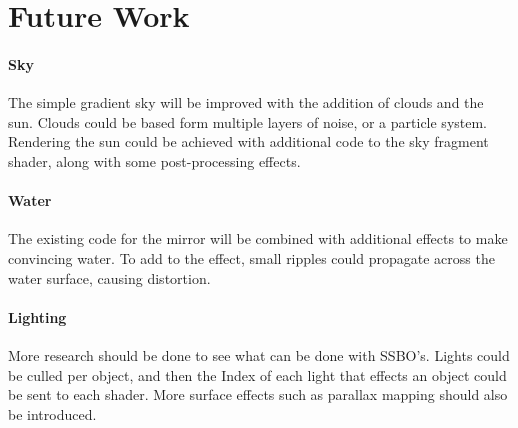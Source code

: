 \documentclass[conference]{acmsiggraph}
\begin{document}
\section{Future Work}

\paragraph{Sky}
The simple gradient sky will be improved with the addition of clouds and the sun. Clouds could be based form multiple layers of noise, or a particle system. Rendering the sun could be achieved with additional code to the sky fragment shader, along with some post-processing effects.

\paragraph{Water}
The existing code for the mirror will be combined with additional effects to make convincing water. To add to the effect, small ripples could propagate across the water surface, causing distortion.

\paragraph{Lighting}
More research should be done to see what can be done with SSBO's. Lights could be culled per object, and then the Index of each light that effects an object could be sent to each shader. More surface effects such as parallax mapping should also be introduced.



\end{document}
